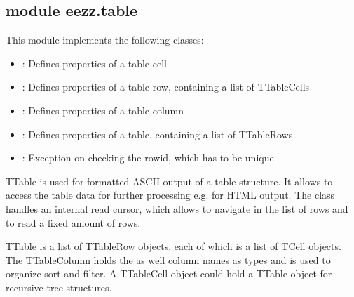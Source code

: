 \documentclass[letterpaper,10pt,english]{sphinxmanual}
\begin{document}
\subsection{module eezz.table}
\label{\detokenize{eezz:module-eezz.table}}\label{\detokenize{eezz:module-eezz-table}}
\sphinxAtStartPar
This module implements the following classes:
\begin{itemize}
\item {} 
\sphinxAtStartPar
{\hyperref[\detokenize{eezz:eezz.table.TTableCell}]{}}:   Defines properties of a table cell

\item {} 
\sphinxAtStartPar
{\hyperref[\detokenize{eezz:eezz.table.TTableRow}]{}}:    Defines properties of a table row, containing a list of TTableCells

\item {} 
\sphinxAtStartPar
{\hyperref[\detokenize{eezz:eezz.table.TTableColumn}]{}}: Defines properties of a table column

\item {} 
\sphinxAtStartPar
{\hyperref[\detokenize{eezz:eezz.table.TTable}]{}}:       Defines properties of a table, containing a list of TTableRows

\item {} 
\sphinxAtStartPar
{}: Exception on checking the row\sphinxhyphen{}id, which has to be unique

\end{itemize}

\sphinxAtStartPar
TTable is used for formatted ASCII output of a table structure.
It allows to access the table data for further processing e.g. for HTML output. The class handles an
internal read cursor, which allows to navigate in the list of rows and to read a fixed amount of rows.

\sphinxAtStartPar
TTable is a list of TTableRow objects, each of which is a list of TCell objects.
The TTableColumn holds the as well column names as types and is used to organize sort and filter.
A TTableCell object could hold a TTable object for recursive tree structures.
\end{document}
